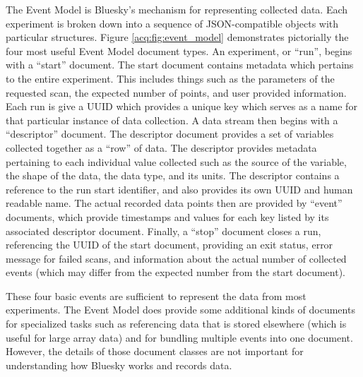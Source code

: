 The Event Model\cite{eventmodel} is Bluesky's mechanism for representing collected data.
Each experiment is broken down into a sequence of JSON-compatible objects with particular structures.
Figure \ref{acq:fig:event_model} demonstrates pictorially the four most useful Event Model document types.
An experiment, or ``run'', begins with a ``start'' document.
The start document contains metadata which pertains to the entire experiment.
This includes things such as the parameters of the requested scan, the expected number of points, and user provided information.
Each run is give a \Gls{UUID} which provides a unique key which serves as a name for that particular instance of data collection.
A data stream then begins with a ``descriptor'' document.
The descriptor document provides a set of variables collected together as a ``row'' of data.
The descriptor provides metadata pertaining to each individual value collected such as the source of the variable, the shape of the data, the data type, and its units.
The descriptor contains a reference to the run start identifier, and also provides its own \Gls{UUID} and human readable name.
The actual recorded data points then are provided by ``event'' documents, which provide timestamps and values for each key listed by its associated descriptor document.
Finally, a ``stop'' document closes a run, referencing the UUID of the start document, providing an exit status, error message for failed scans, and information about the actual number of collected events (which may differ from the expected number from the start document).

These four basic events are sufficient to represent the data from most experiments.
The Event Model does provide some additional kinds of documents for specialized tasks such as referencing data that is stored elsewhere (which is useful for large array data) and for bundling multiple events into one document.
However, the details of those document classes are not important for understanding how Bluesky works and records data.


